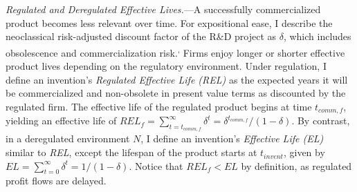\documentclass[letterpaper,12pt]{article}
\theoremstyle{definition}
\begin{document}
\textit{Regulated and Deregulated Effective Lives.}---A successfully commercialized product becomes less relevant over time. For expositional ease, I describe the neoclassical risk-adjusted discount factor of the R\&D project as $\delta$, which includes obsolescence and commercialization risk.\footnotemark {}\textsuperscript{,}\footnotemark {} Firms enjoy longer or shorter effective product lives depending on the regulatory environment. Under regulation, I define an invention's \textit{Regulated Effective Life (REL)} as the expected years it will be commercialized and non-obsolete in present value terms as discounted by the regulated firm. The effective life of the regulated product begins at time $t_{comm,f}$, yielding an effective life of $REL_f = \sum_{t=t_{comm,f}}^\infty \delta^t = \delta^{t_{comm,f}}/(1 - \delta)$.
By contrast, in a deregulated environment $N$, I define an invention's \textit{Effective Life (EL)} similar to \textit{REL}, except the lifespan of the product starts at $t_{invent}$, given by $EL = \sum_{t=0}^\infty \delta^t = 1/(1-\delta)$. Notice that $REL_f < EL$ by definition, as regulated profit flows are delayed.


\vspace{10pt}
\end{document}
